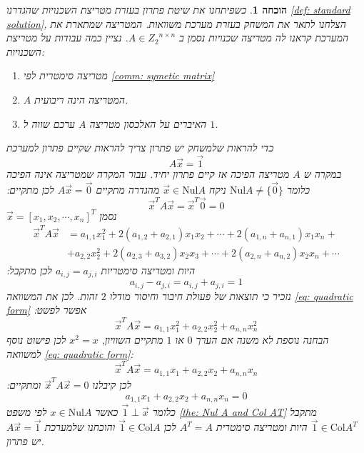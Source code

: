 \documentclass[12pt,leqno]{article}
\theoremstyle{theoremdd}
\newtheorem*{prove}{הוכחה}
\newcommand{\Col}{\mathrm{Col}}
\newcommand{\Nul}{\mathrm{Nul}}
\begin{document}
\begin{prove}
    כשפיתחנו את 
    שיטת פתרון 
    בעזרת מטריצת השכנויות 
    שהגדרנו
    \ref{def: standard solution},
    הצלחנו לתאר את המשחק בעזרת 
    מערכת משוואות.
    המטריצה שמתארת את המערכת קראנו לה מטריצה שכנויות
    נסמן ב
    $A \in {Z_2}^{n \times n}$.
    נציין כמה עבודות על מטריצת השכנויות:
    \begin{enumerate}
        \item 
        מטריצה סימטרית לפי
        \ref{comm: symetic matrix}
        \item 
        $A$
        המטריצה הינה ריבועית.
        \item 
        האיברים על האלכסון
        מטריצה 
        $A$
        ערכם שווה ל
        $1$.
    \end{enumerate}

    כדי להראות שלמשחק יש פתרון 
    צריך להראות שקיים פתרון למערכת
    \[A \vec{x} = \vec{1} \]
    במקרה ש 
    $A$
    מטריצה הפיכה אז קיים פתרון יחיד.
    עבור המקרה שמטריצה אינה הפיכה 
    כלומר 
    $\Nul A \neq \{ \vec{0}\}$
    ניקח 
    $\vec{x} \in \Nul A$
    מהגדרה מתקיים
    $A\vec{x} = \vec{0}$
    לכן מתקיים:
    \[\vec{x}^T A \vec{x} = \vec{x}^T\vec{0} = 0\]
    נסמן 
    $\vec{x} = [x_1, x_2, \cdots, x_n]^T$
    \begin{align}
        \label{eq: quadratic form}
            \vec{x}^T A \vec{x} &= a_{1,1}x_1^2 + 2(a_{1,2} + a_{2,1})x_1x_2 + \cdots + 2(a_{1,n} + a_{n,1})x_1x_n +  \\
            \nonumber &+ a_{2,2}x_2^2 +  2(a_{2,3} + a_{3,2})x_2x_3 + \cdots  + 2(a_{2,n} + a_{n,2})x_2x_n + \cdots 
    \end{align}
    היות ומטריצה סימטריות
    $a_{i,j} = a_{j,i}$
    לכן
    מתקבל:
    \[a_{i,j} - a_{j,i} = a_{i,j} + a_{j,i} = 1 \]
    נזכיר כי תוצאות של פעולת חיבור וחיסור מודלו 
    $2$
    זהות.
    לכן
    את המשוואה 
    \ref{eq: quadratic form}
    אפשר לפשט:
    \[ \vec{x}^T A \vec{x} = a_{1,1}x_1^2 + a_{2,2} x_2^2 +  a_{n,n} x_n^2\]
    הבחנה נוספת
    לא משנה אם הערך 
    $0$
    או
    $1$
    מתקיים השוויון,
    $x^2 = x$
    לכן פישוט נוסף למשוואה 
    \ref{eq: quadratic form}:
    \[ \vec{x}^T A \vec{x} = a_{1,1}x_1 + a_{2,2} x_2 +  a_{n,n} x_n\]
    לכן קיבלנו 
    $ \vec{x}^T A \vec{x} = 0$
    ומתקיים:
    \[a_{1,1}x_1 + a_{2,2} x_2 +  a_{n,n} x_n = 0\]
    כלומר 
    $\vec{1} \perp  \vec{x}$
    כאשר 
    $x \in \Nul A$
    לפי משפט 
    \ref{the: Nul A and Col AT}
    מתקבל 
    $\vec{1} \in \Col A^T$
    היות ומטריצה סימטרית 
    $A^T = A$
    לכן
    $\vec{1} \in \Col A$
    והוכחנו שלמערכת
    $A\vec{x} = \vec{1}$
    יש פתרון.
\end{prove}
\end{document}
